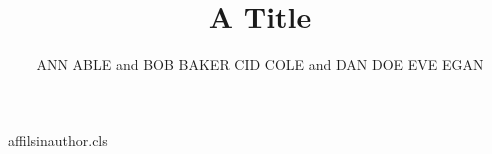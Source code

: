 \begin{filecontents*}[overwrite]{affilsinauthor.cls}
\def\affilfont{\small}
\def\author#1{\gdef\@author{#1}}
\def\affil#1{\gdef\@affil{#1}\ifx\@affil\@empty\else{\reset@font\affilfont\unskip,\ #1\vphantom{gy}\endgraf}\fi}\affil{}
\def\maketitle{\par{\Large\@title\par}{\noindent\@author\par}}
\end{filecontents*}
\documentclass{affilsinauthor}

\title{A Title}
\author{ANN ABLE and BOB BAKER 
CID COLE and DAN DOE
EVE EGAN
}
\maketitle
Body.

